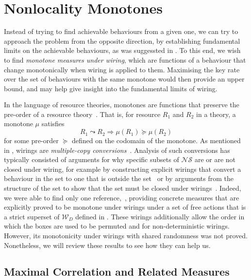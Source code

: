 \documentclass[10pt, a4paper]{article}
\numberwithin{equation}{section} %
\theoremstyle{definition}
\theoremstyle{plain}
\newcommand{\?}{\mathrel{?}} %
\newcommand{\sW}{\mathcal{W}}
\newcommand{\NSs}{\mathcal{NS}}
\begin{document}
    \section{Nonlocality Monotones}\label{sec:nlmono}

    Instead of trying to find achievable behaviours from a given one, we can try to approach the problem from the opposite direction, by establishing fundamental limits on the achievable behaviours, as was suggessted in . To this end, we wish to find \emph{monotone measures under wiring}, which are functions of a behaviour that change monotonically when wiring is applied to them. Maximising the key rate over the set of behaviours with the same monotone would then provide an upper bound, and may help give insight into the fundamental limits of wiring.

    In the language of resource theories, monotones are functions that preserve the pre-order of a resource theory~\cite{BellResourceTheory}. That is, for resource \(R_1\) and \(R_2\) in a theory, a monotone \(\mu\) satisfies
    \begin{equation}
      R_1 \leadsto R_2 \Rightarrow \mu(R_1) \succeq \mu(R_2)
    \end{equation}
    for some pre-order \(\succeq\) defined on the codomain of the monotone. As mentioned in , wirings are \emph{multiple-copy conversions}~\cite{BellResourceTheory}. Analysis of such conversions has typically consisted of arguments for why specific subsets of \(\NSs\) are or are not closed under wiring, for example by constructing explicit wirings that convert a behaviour in the set to one that is outside the set~\cite{ClosedCorrSets} or by arguments from the structure of the set to show that the set must be closed under wirings~\cite{NonlocalZoo}. Indeed, we were able to find only one reference,~\cite{NLMonotones}, providing concrete measures that are explicitly proved to be monotone under wirings under a set of free actions that is a strict superset of \(\sW_D\) defined in . These wirings additionally allow the order in which the boxes are used to be permuted and for non-deterministic wirings. However, its monotonicity under wirings with shared randomness was not proved. Nonetheless, we will review these results to see how they can help us.

    \subsection{Maximal Correlation and Related Measures}\label{sec:nlmono_maxcorr}
\end{document}
